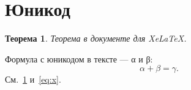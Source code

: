 \documentclass[12pt]{article}
\newtheorem{theorem}{Теорема}
\begin{document}
\section{Юникод}

\begin{theorem}\label{thm:x}
Теорема в документе для XeLaTeX.
\end{theorem}

Формула с юникодом в тексте — α и β:
\begin{equation}\label{eq:x}
  \alpha + \beta = \gamma .
\end{equation}
См.~\ref{thm:x} и~\eqref{eq:x}.
\end{document}
